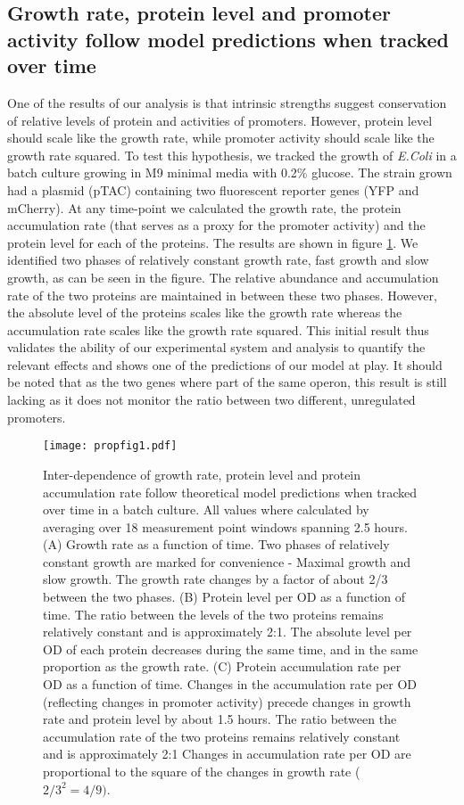 \documentclass[a4page,notitlepage]{article}
\begin{document}
\subsection{Growth rate, protein level and promoter activity follow model predictions when tracked over time}
One of the results of our analysis is that intrinsic strengths suggest conservation of relative levels of protein and activities of promoters.
However, protein level should scale like the growth rate, while promoter activity should scale like the growth rate squared.
To test this hypothesis, we tracked the growth of \emph{E.Coli} in a batch culture growing in M9 minimal media with 0.2\% glucose.
The strain grown had a plasmid (pTAC) containing two fluorescent reporter genes (YFP and mCherry).
At any time-point we calculated the growth rate, the protein accumulation rate (that serves as a proxy for the promoter activity) and the protein level for each of the proteins.
The results are shown in figure \ref{time-gr-fig}.
We identified two phases of relatively constant growth rate, fast growth and slow growth, as can be seen in the figure.
The relative abundance and accumulation rate of the two proteins are maintained in between these two phases.
However, the absolute level of the proteins scales like the growth rate whereas the accumulation rate scales like the growth rate squared.
This initial result thus validates the ability of our experimental system and analysis to quantify the relevant effects and shows one of the predictions of our model at play.
It should be noted that as the two genes where part of the same operon, this result is still lacking as it does not monitor the ratio between two different, unregulated promoters.
\begin{figure}[h]
\texttt{[image: propfig1.pdf]}
\caption{Inter-dependence of growth rate, protein level and protein accumulation rate follow theoretical model predictions when tracked over time in a batch culture.
All values where calculated by averaging over 18 measurement point windows spanning 2.5 hours.
(A) Growth rate as a function of time.
Two phases of relatively constant growth are marked for convenience - Maximal growth and slow growth.
The growth rate changes by a factor of about 2/3 between the two phases.
(B) Protein level per OD as a function of time.
The ratio between the levels of the two proteins remains relatively constant and is approximately 2:1.
The absolute level per OD of each protein decreases during the same time, and in the same proportion as the growth rate.
(C) Protein accumulation rate per OD as a function of time.
Changes in the accumulation rate per OD (reflecting changes in promoter activity) precede changes in growth rate and protein level by about 1.5 hours.
The ratio between the accumulation rate of the two proteins remains relatively constant and is approximately 2:1
Changes in accumulation rate per OD are proportional to the square of the changes in growth rate ($2/3^2=4/9)$.}
\label{time-gr-fig}
\end{figure}
\end{document}
